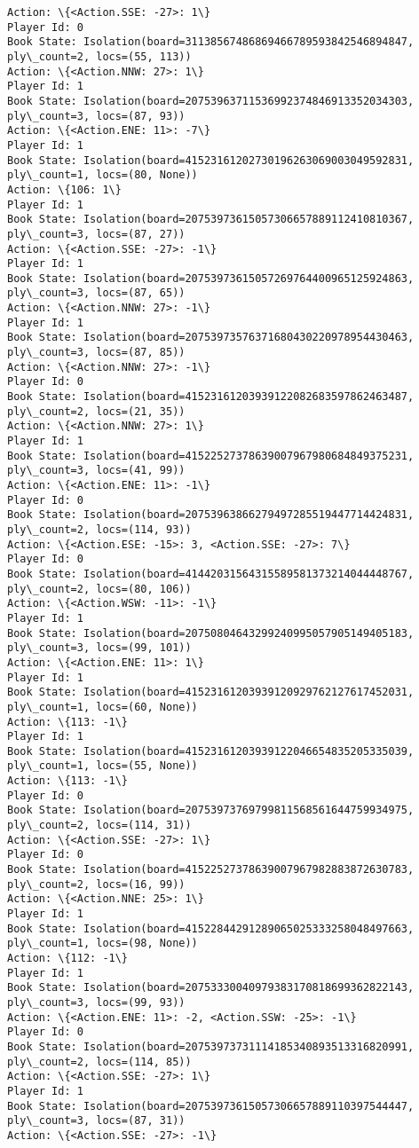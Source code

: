 \documentclass[11pt]{article}
\begin{document}
\begin{Verbatim}[commandchars=\\\{\}]
Action: \{<Action.SSE: -27>: 1\}
Player Id: 0
Book State: Isolation(board=31138567486869466789593842546894847, ply\_count=2, locs=(55, 113))
Action: \{<Action.NNW: 27>: 1\}
Player Id: 1
Book State: Isolation(board=20753963711536992374846913352034303, ply\_count=3, locs=(87, 93))
Action: \{<Action.ENE: 11>: -7\}
Player Id: 1
Book State: Isolation(board=41523161202730196263069003049592831, ply\_count=1, locs=(80, None))
Action: \{106: 1\}
Player Id: 1
Book State: Isolation(board=20753973615057306657889112410810367, ply\_count=3, locs=(87, 27))
Action: \{<Action.SSE: -27>: -1\}
Player Id: 1
Book State: Isolation(board=20753973615057269764400965125924863, ply\_count=3, locs=(87, 65))
Action: \{<Action.NNW: 27>: -1\}
Player Id: 1
Book State: Isolation(board=20753973576371680430220978954430463, ply\_count=3, locs=(87, 85))
Action: \{<Action.NNW: 27>: -1\}
Player Id: 0
Book State: Isolation(board=41523161203939122082683597862463487, ply\_count=2, locs=(21, 35))
Action: \{<Action.NNW: 27>: 1\}
Player Id: 1
Book State: Isolation(board=41522527378639007967980684849375231, ply\_count=3, locs=(41, 99))
Action: \{<Action.ENE: 11>: -1\}
Player Id: 0
Book State: Isolation(board=20753963866279497285519447714424831, ply\_count=2, locs=(114, 93))
Action: \{<Action.ESE: -15>: 3, <Action.SSE: -27>: 7\}
Player Id: 0
Book State: Isolation(board=41442031564315589581373214044448767, ply\_count=2, locs=(80, 106))
Action: \{<Action.WSW: -11>: -1\}
Player Id: 1
Book State: Isolation(board=20750804643299240995057905149405183, ply\_count=3, locs=(99, 101))
Action: \{<Action.ENE: 11>: 1\}
Player Id: 1
Book State: Isolation(board=41523161203939120929762127617452031, ply\_count=1, locs=(60, None))
Action: \{113: -1\}
Player Id: 1
Book State: Isolation(board=41523161203939122046654835205335039, ply\_count=1, locs=(55, None))
Action: \{113: -1\}
Player Id: 0
Book State: Isolation(board=20753973769799811568561644759934975, ply\_count=2, locs=(114, 31))
Action: \{<Action.SSE: -27>: 1\}
Player Id: 0
Book State: Isolation(board=41522527378639007967982883872630783, ply\_count=2, locs=(16, 99))
Action: \{<Action.NNE: 25>: 1\}
Player Id: 1
Book State: Isolation(board=41522844291289065025333258048497663, ply\_count=1, locs=(98, None))
Action: \{112: -1\}
Player Id: 1
Book State: Isolation(board=20753330040979383170818699362822143, ply\_count=3, locs=(99, 93))
Action: \{<Action.ENE: 11>: -2, <Action.SSW: -25>: -1\}
Player Id: 0
Book State: Isolation(board=20753973731114185340893513316820991, ply\_count=2, locs=(114, 85))
Action: \{<Action.SSE: -27>: 1\}
Player Id: 1
Book State: Isolation(board=20753973615057306657889110397544447, ply\_count=3, locs=(87, 31))
Action: \{<Action.SSE: -27>: -1\}


\end{Verbatim}
\end{document}
